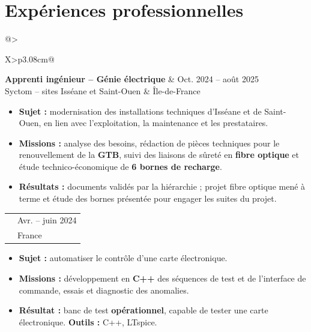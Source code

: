 \documentclass[10pt,a4paper]{extarticle}
\makeatletter
\newcommand{\entry}[4]{%
\begin{tabularx}{\linewidth}{@{}>{\raggedright\arraybackslash}X>{\raggedleft\arraybackslash}p{3.08cm}@{}}
 {\bfseries\color{bleu}#1} & {\fontsize{9}{10.3}\selectfont\color{secondaire}#2} \\[-2pt]
 {\fontsize{9}{10.4}\selectfont\color{secondaire}#3} & {\fontsize{9}{10.3}\selectfont\color{secondaire}#4}
\end{tabularx}\vspace{-2.6pt}\par}
\newcommand{\gapentry}{\vspace{2.4pt}}
\makeatother
\begin{document}
\section{Expériences professionnelles}
\entry{Apprenti ingénieur -- Génie électrique}{Oct. 2024 -- août 2025}{Syctom -- sites Isséane et Saint-Ouen}{Île-de-France}
\begin{itemize}
  \item \textbf{Sujet :} modernisation des installations techniques d'Isséane et de Saint-Ouen, en lien avec l'exploitation, la maintenance et les prestataires.
  \item \textbf{Missions :} analyse des besoins, rédaction de pièces techniques pour le renouvellement de la \textbf{GTB}, suivi des liaisons de sûreté en \textbf{fibre optique} et étude technico-économique de \textbf{6 bornes de recharge}.
  \item \textbf{Résultats :} documents validés par la hiérarchie ; projet fibre optique mené à terme et étude des bornes présentée pour engager les suites du projet.
\end{itemize}
\gapentry
\entry{Stagiaire technicien électronicien supérieur}{Avr. -- juin 2024}{Cobham Aerospace Communications}{France}
\begin{itemize}
  \item \textbf{Sujet :} automatiser le contrôle d'une carte électronique.
  \item \textbf{Missions :} développement en \textbf{C++} des séquences de test et de l'interface de commande, essais et diagnostic des anomalies.
  \item \textbf{Résultat :} banc de test \textbf{opérationnel}, capable de tester une carte électronique. \textbf{Outils :} C++, LTspice.
\end{itemize}
\end{document}
